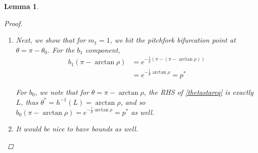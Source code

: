 \documentclass[12pt]{article}
\newtheorem{lemma}{Lemma}
\begin{document}
\begin{lemma}
\begin{proof}
\begin{enumerate}
\begin{enumerate}
		\begin{align*}
		b_1(-\arctan \rho) &= e^{ -\frac{1}{\rho}(m_1 \pi + \arctan \rho) } \\
		\tilde{b}_1(\pi - \arctan \rho) 
		&= e^{ -\frac{1}{\rho}((m_1+1) \pi - (\pi - \arctan \rho)) } \\
		&= e^{ -\frac{1}{\rho}(m_1 \pi + \arctan \rho)) } = b_1(-\arctan \rho)
		\end{align*}

		These are the same, so the $b_1$ component matches. For the $b_0$ component, we note that we obtain $\theta^*$ and $\tilde{\theta}^*$ by solving

		\begin{align*}
		\theta^* &= h^{-1} (b_1(-\arctan \rho)) \\
		\tilde{\theta}^* &= h^{-1} (\tilde{b}_1(\pi - \arctan \rho)) 
		\end{align*}

		Since the RHS of the two equations is the same, we conclude that $\theta^* = \tilde{\theta}^*$, thus $b_0(-\arctan \rho) = \tilde{b}_0(\pi - \arctan \rho)$, and so the $b_0$ components match.

		\item Next, we show that for $m_1 = 1$, we hit the pitchfork bifurcation point at $\theta = \pi - \theta_0$. For the $b_1$ component, 
		\begin{align*}
		b_1(\pi -\arctan \rho) &= e^{ -\frac{1}{\rho}(\pi - (\pi - \arctan \rho)) } \\
		&= e^{ -\frac{1}{\rho} \arctan \rho } = p^*
		\end{align*}

		For $b_0$, we note that for $\theta = \pi -\arctan \rho$, the RHS of \eqref{thetastareq} is exactly $L$, thus $\theta^* = h^{-1}(L) = \arctan \rho$, and so $b_0(\pi -\arctan \rho) = e^{ -\frac{1}{\rho} \arctan \rho } = p^*$ as well.

		\item It would be nice to have bounds as well.
	\end{enumerate}
\end{enumerate}

\end{proof}
\end{lemma}
\end{document}
